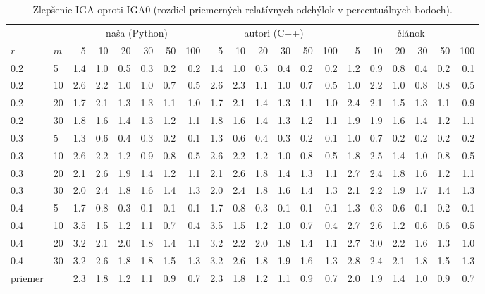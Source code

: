 \begin{table}[ht]
\centering
\scriptsize
\setlength{\tabcolsep}{3pt}
\caption{Zlepšenie IGA oproti IGA0 (rozdiel priemerných relatívnych odchýlok v percentuálnych bodoch).}
\label{tab:improvement_iga}
\begin{tabular}{ll|rrrrrr|rrrrrr|rrrrrr}
\toprule
 &  & \multicolumn{6}{c}{naša (Python)} & \multicolumn{6}{c}{autori (C++)} & \multicolumn{6}{c}{článok} \\
$r$ & $m$ & 5 & 10 & 20 & 30 & 50 & 100 & 5 & 10 & 20 & 30 & 50 & 100 & 5 & 10 & 20 & 30 & 50 & 100 \\
\midrule
0.2 & 5 & 1.4 & 1.0 & 0.5 & 0.3 & 0.2 & 0.2 & 1.4 & 1.0 & 0.5 & 0.4 & 0.2 & 0.2 & 1.2 & 0.9 & 0.8 & 0.4 & 0.2 & 0.1 \\
0.2 & 10 & 2.6 & 2.2 & 1.0 & 1.0 & 0.7 & 0.5 & 2.6 & 2.3 & 1.1 & 1.0 & 0.7 & 0.5 & 1.0 & 2.2 & 1.0 & 0.8 & 0.8 & 0.5 \\
0.2 & 20 & 1.7 & 2.1 & 1.3 & 1.3 & 1.1 & 1.0 & 1.7 & 2.1 & 1.4 & 1.3 & 1.1 & 1.0 & 2.4 & 2.1 & 1.5 & 1.3 & 1.1 & 0.9 \\
0.2 & 30 & 1.8 & 1.6 & 1.4 & 1.3 & 1.2 & 1.1 & 1.8 & 1.6 & 1.4 & 1.3 & 1.2 & 1.1 & 1.9 & 1.9 & 1.6 & 1.4 & 1.2 & 1.1 \\
0.3 & 5 & 1.3 & 0.6 & 0.4 & 0.3 & 0.2 & 0.1 & 1.3 & 0.6 & 0.4 & 0.3 & 0.2 & 0.1 & 1.0 & 0.7 & 0.2 & 0.2 & 0.2 & 0.2 \\
0.3 & 10 & 2.6 & 2.2 & 1.2 & 0.9 & 0.8 & 0.5 & 2.6 & 2.2 & 1.2 & 1.0 & 0.8 & 0.5 & 1.8 & 2.5 & 1.4 & 1.0 & 0.8 & 0.5 \\
0.3 & 20 & 2.1 & 2.6 & 1.9 & 1.4 & 1.2 & 1.1 & 2.1 & 2.6 & 1.8 & 1.4 & 1.3 & 1.1 & 2.7 & 2.4 & 1.8 & 1.6 & 1.2 & 1.1 \\
0.3 & 30 & 2.0 & 2.4 & 1.8 & 1.6 & 1.4 & 1.3 & 2.0 & 2.4 & 1.8 & 1.6 & 1.4 & 1.3 & 2.1 & 2.2 & 1.9 & 1.7 & 1.4 & 1.3 \\
0.4 & 5 & 1.7 & 0.8 & 0.3 & 0.1 & 0.1 & 0.1 & 1.7 & 0.8 & 0.3 & 0.1 & 0.1 & 0.1 & 1.3 & 0.3 & 0.6 & 0.1 & 0.2 & 0.1 \\
0.4 & 10 & 3.5 & 1.5 & 1.2 & 1.1 & 0.7 & 0.4 & 3.5 & 1.5 & 1.2 & 1.0 & 0.7 & 0.4 & 2.7 & 2.6 & 1.2 & 0.6 & 0.6 & 0.5 \\
0.4 & 20 & 3.2 & 2.1 & 2.0 & 1.8 & 1.4 & 1.1 & 3.2 & 2.2 & 2.0 & 1.8 & 1.4 & 1.1 & 2.7 & 3.0 & 2.2 & 1.6 & 1.3 & 1.0 \\
0.4 & 30 & 3.2 & 2.6 & 1.8 & 1.8 & 1.5 & 1.3 & 3.2 & 2.6 & 1.8 & 1.9 & 1.6 & 1.3 & 2.8 & 2.4 & 2.1 & 1.8 & 1.5 & 1.3 \\
\midrule
priemer &  & 2.3 & 1.8 & 1.2 & 1.1 & 0.9 & 0.7 & 2.3 & 1.8 & 1.2 & 1.1 & 0.9 & 0.7 & 2.0 & 1.9 & 1.4 & 1.0 & 0.9 & 0.7 \\
\bottomrule
\end{tabular}
\end{table}
